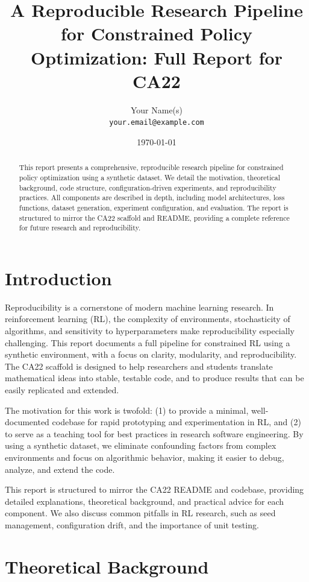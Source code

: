 \documentclass[11pt]{article}
\title{A Reproducible Research Pipeline for Constrained Policy Optimization: \newline Full Report for CA22}
\author{Your Name(s) \\\texttt{your.email@example.com}}
\date{\today}
\begin{document}
\maketitle

\begin{abstract}
This report presents a comprehensive, reproducible research pipeline for constrained policy optimization using a synthetic dataset. We detail the motivation, theoretical background, code structure, configuration-driven experiments, and reproducibility practices. All components are described in depth, including model architectures, loss functions, dataset generation, experiment configuration, and evaluation. The report is structured to mirror the CA22 scaffold and README, providing a complete reference for future research and reproducibility.
\end{abstract}


\section{Introduction}
Reproducibility is a cornerstone of modern machine learning research. In reinforcement learning (RL), the complexity of environments, stochasticity of algorithms, and sensitivity to hyperparameters make reproducibility especially challenging. This report documents a full pipeline for constrained RL using a synthetic environment, with a focus on clarity, modularity, and reproducibility. The CA22 scaffold is designed to help researchers and students translate mathematical ideas into stable, testable code, and to produce results that can be easily replicated and extended.

The motivation for this work is twofold: (1) to provide a minimal, well-documented codebase for rapid prototyping and experimentation in RL, and (2) to serve as a teaching tool for best practices in research software engineering. By using a synthetic dataset, we eliminate confounding factors from complex environments and focus on algorithmic behavior, making it easier to debug, analyze, and extend the code.

This report is structured to mirror the CA22 README and codebase, providing detailed explanations, theoretical background, and practical advice for each component. We also discuss common pitfalls in RL research, such as seed management, configuration drift, and the importance of unit testing.

\section{Theoretical Background}
\end{document}
